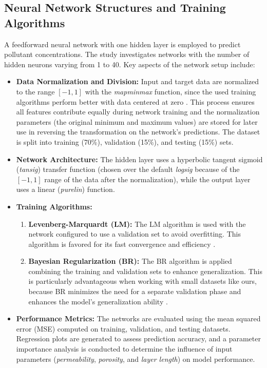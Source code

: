 \documentclass[10pt]{article}
\begin{document}
	\subsection{Neural Network Structures and Training Algorithms}
	A feedforward neural network with one hidden layer is employed to predict pollutant concentrations. The study investigates networks with the number of hidden neurons varying from 1 to 40. Key aspects of the network setup include:
	\begin{itemize}
		\item \textbf{Data Normalization and Division:} Input and target data are normalized to the range \([-1, 1]\) with the \textit{mapminmax} function, since the used training algorithms perform better with data centered at zero \cite{guzman2017,taherdangkoo2020}. This process ensures all features contribute equally during network training and the normalization parameters (the original minimum and maximum values) are stored for later use in reversing the transformation on the network's predictions.
		The dataset is split into training (70\%), validation (15\%), and testing (15\%) sets.
		\item \textbf{Network Architecture:} The hidden layer uses a hyperbolic tangent sigmoid (\textit{tansig}) transfer function (chosen over the default \textit{logsig} because of the \([-1, 1]\) range of the data after the normalization), while the output layer uses a linear (\textit{purelin}) function.
		\item \textbf{Training Algorithms:} 
		\begin{enumerate}
			\item \textbf{Levenberg-Marquardt (LM):} The LM algorithm is used with the network configured to use a validation set to avoid overfitting. This algorithm is favored for its fast convergence and efficiency \cite{taherdangkoo2020}.
			\item \textbf{Bayesian Regularization (BR):} The BR algorithm is applied combining the training and validation sets to enhance generalization. This is particularly advantageous when working with small datasets like ours, because BR minimizes the need for a separate validation phase and enhances the model’s generalization ability \cite{taherdangkoo2020}.
		\end{enumerate}
		
		
		\item \textbf{Performance Metrics:} The networks are evaluated using the mean squared error (MSE) computed on training, validation, and testing datasets. Regression plots are generated to assess prediction accuracy, and a parameter importance analysis is conducted to determine the influence of input parameters (\textit{permeability}, \textit{porosity}, and \textit{layer length}) on model performance. 
		

\end{itemize}
\end{document}
